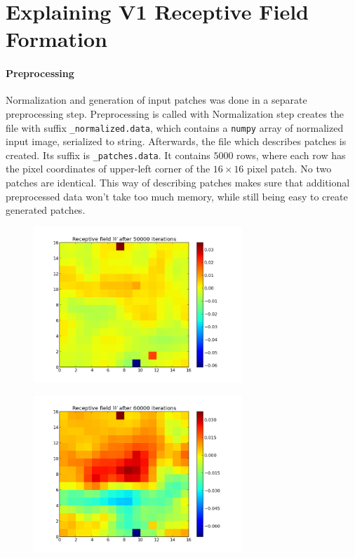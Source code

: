 \section{Explaining V1 Receptive Field Formation}

\paragraph{Preprocessing}
Normalization and generation of input patches was done in a separate
preprocessing step. Preprocessing is called with
Normalization step creates the file with suffix \texttt{\_normalized.data},
which contains a \texttt{numpy} array of normalized input image, serialized to
string. Afterwards, the file which describes patches is created. Its suffix is
\texttt{\_patches.data}. It contains $5000$ rows, where each row has the pixel
coordinates of upper-left corner of the $16 \times 16$ pixel patch. No two
patches are identical. This way of describing patches makes sure that additional
preprocessed data won't take too much memory, while still being easy to create
generated patches.

\begin{figure}[h]
\centering
\includegraphics[width=0.7\textwidth]{../ex3/results1/img06}
\caption{}
\label{fig:img06}
\end{figure}

\begin{figure}[h]
\centering
\includegraphics[width=0.7\textwidth]{../ex3/results1/img07}
\caption{}
\label{fig:img07}
\end{figure}

